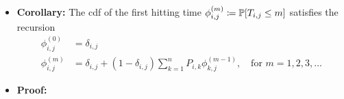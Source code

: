 \documentclass[11pt,twoside]{report}
\newcommand{\bbZ}{{\mathbb{Z}}}
\begin{document}
\begin{itemize}
\item \textbf{Corollary:} The cdf of the first hitting time $\phi_{i,j}^{(m)} \coloneqq \pr{ T_{i,j} \le m} $  satisfies the recursion 
\begin{align*}
\phi_{i,j}^{(0)} & = \delta_{i,j}\\
\phi_{i,j}^{(m)} & =\delta_{i,j}+(1-\delta_{i,j})\sum_{k=1}^{n}P_{i,k}\phi_{k,j}^{(m-1)},  \quad \text{for $m = 1,2,3,\dots$} %
\end{align*}

\item \textbf{Proof:} 

\begin{itemize}
%
%
%
%


\end{itemize}
\end{itemize}
\end{document}
